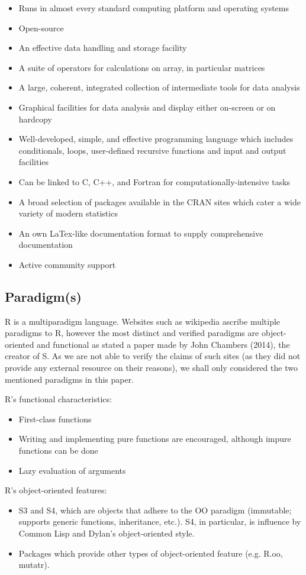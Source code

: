 \documentclass[12pt]{article}
\begin{document}
\begin{itemize}
\item Runs in almost every standard computing platform and operating systems
\item Open-source
\item An effective data handling and storage facility
\item A suite of operators for calculations on array, in particular matrices
\item A large, coherent, integrated collection of intermediate tools for data analysis
\item Graphical facilities for data analysis and display either on-screen or on hardcopy
\item Well-developed, simple, and effective programming language which includes conditionals, loops, user-defined recursive functions and input and output facilities
\item Can be linked to C, C++, and Fortran for computationally-intensive tasks
\item A broad selection of packages available in the CRAN sites which cater a wide variety of modern statistics
\item An own LaTex-like documentation format to supply comprehensive documentation
\item Active community support
\end{itemize}

\subsection{Paradigm(s)}
R is a multiparadigm language. Websites such as wikipedia ascribe multiple paradigms to R, however the most distinct and verified paradigms are object-oriented and functional as stated a paper made by John Chambers (2014), the creator of S. As we are not able to verify the claims of such sites (as they did not provide any external resource on their reasons), we shall only considered the two mentioned paradigms in this paper.


R's functional characteristics:
\begin{itemize}
\item First-class functions
\item Writing and implementing pure functions are encouraged, although impure functions can be done
\item Lazy evaluation of arguments
\end{itemize}

R's object-oriented features:
\begin{itemize}
\item S3 and S4, which are objects that adhere to the OO paradigm (immutable; supports generic functions, inheritance, etc.). S4, in particular, is influence by Common Lisp and Dylan's object-oriented style.
\item Packages which provide other types of object-oriented feature (e.g. R.oo, mutatr).
\end{itemize}
\end{document}
